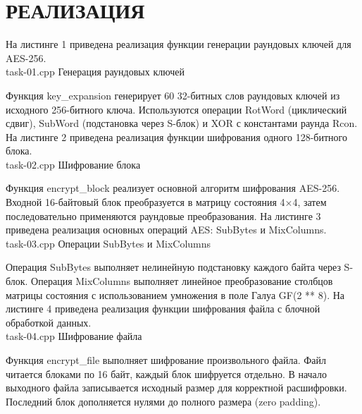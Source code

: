 \chapter*{РЕАЛИЗАЦИЯ}

На листинге 1 приведена реализация функции генерации раундовых ключей для AES-256.\\
    {task-01.cpp}
    {}
    {Генерация раундовых ключей}

Функция key\_expansion генерирует 60 32-битных слов раундовых ключей из исходного 256-битного ключа. Используются операции RotWord (циклический сдвиг), SubWord (подстановка через S-блок) и XOR с константами раунда Rcon.
На листинге 2 приведена реализация функции шифрования одного 128-битного блока.\\
    {task-02.cpp}
    {}
    {Шифрование блока}

Функция encrypt\_block реализует основной алгоритм шифрования AES-256. Входной 16-байтовый блок преобразуется в матрицу состояния 4×4, затем последовательно применяются раундовые преобразования.
На листинге 3 приведена реализация основных операций AES: SubBytes и MixColumns.\\
    {task-03.cpp}
    {}
    {Операции SubBytes и MixColumns}

Операция SubBytes выполняет нелинейную подстановку каждого байта через S-блок. Операция MixColumns выполняет линейное преобразование столбцов матрицы состояния с использованием умножения в поле Галуа GF(2 ** 8).
На листинге 4 приведена реализация функции шифрования файла с блочной обработкой данных.\\
    {task-04.cpp}
    {}
    {Шифрование файла}

Функция encrypt\_file выполняет шифрование произвольного файла. Файл читается блоками по 16 байт, каждый блок шифруется отдельно. В начало выходного файла записывается исходный размер для корректной расшифровки. Последний блок дополняется нулями до полного размера (zero padding).
